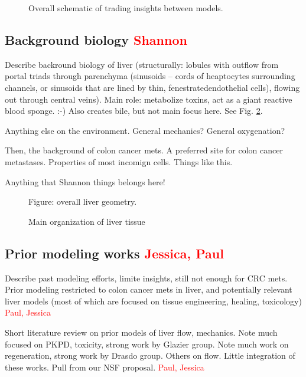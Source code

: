 \documentclass[smallextended,natbib]{svjour3}
\newcommand{\red}[1]{\textcolor{red}{#1}}
\begin{document}
\begin{figure}\sidecaption 
\caption{Overall schematic of trading insights between models.}
\label{fig:multiscale_models}
\end{figure}



\subsection{Background biology \red{Shannon}}
Describe backround biology of liver (structurally: lobules with outflow from portal triads through parenchyma (sinusoids -- cords of heaptocytes surrounding channels, or sinusoids that are lined by thin, fenestratedendothelial cells), flowing out through central veins). Main role: metabolize toxins, act as a giant reactive blood sponge. :-) Also creates bile, but not main focus here.  
See Fig. \ref{fig:liver_schematic}. 

Anything else on the environment. General mechanics? General oxygenation? 

Then, the background of colon cancer mets. A preferred site for colon cancer metastases. Properties of most incomign cells. Things like this. 

Anything that Shannon things belongs here! 

\begin{figure}[tbh]
Figure: overall liver geometry. 
\caption{Main organization of liver tissue} 
\label{fig:liver_schematic}
\end{figure}

\subsection{Prior modeling works \red{Jessica, Paul}}
Describe past modeling efforts, limite insights, still not enough for CRC mets. Prior modeling restricted to colon cancer mets in 
liver, and potentially relevant liver models (most of which are focused on tissue engineering, healing, toxicology) \red{Paul, Jessica}


Short literature review on prior models of liver flow, mechanics. 
Note much focused on PKPD, toxicity, strong work by Glazier group. 
Note much work on regeneration, strong work by Drasdo group. 
Others on flow. 
Little integration of these works. 
Pull from our NSF proposal. \red{Paul, Jessica}
\end{document}
